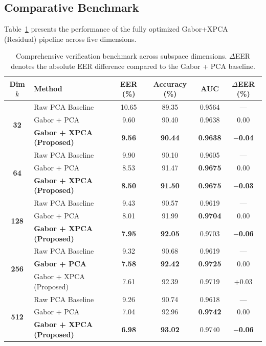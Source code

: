 \documentclass[conference]{IEEEtran}
\begin{document}
\subsection{Comparative Benchmark}
Table~\ref{tab:comprehensive_benchmark} presents the performance of the fully optimized Gabor+XPCA (Residual) pipeline across five dimensions.

\begin{table}[t]
\centering
\caption{Comprehensive verification benchmark across subspace dimensions. $\Delta$EER denotes the absolute EER difference compared to the Gabor + PCA baseline.}
\label{tab:comprehensive_benchmark}
\begin{tabular}{@{}clcccc@{}}
\toprule
\textbf{Dim $k$} & \textbf{Method} & \textbf{EER (\%)} & \textbf{Accuracy (\%)} & \textbf{AUC} & \textbf{$\Delta$EER (\%)} \\
\midrule
\multirow{3}{*}{\textbf{32}}
    & Raw PCA Baseline & 10.65 & 89.35 & 0.9564 & --- \\
    & Gabor + PCA & 9.60 & 90.40 & 0.9638 & 0.00 \\
    & \textbf{Gabor + XPCA (Proposed)} & \textbf{9.56} & \textbf{90.44} & \textbf{0.9638} & \textbf{$-$0.04} \\
\midrule
\multirow{3}{*}{\textbf{64}}
    & Raw PCA Baseline & 9.90 & 90.10 & 0.9605 & --- \\
    & Gabor + PCA & 8.53 & 91.47 & \textbf{0.9675} & 0.00 \\
    & \textbf{Gabor + XPCA (Proposed)} & \textbf{8.50} & \textbf{91.50} & \textbf{0.9675} & \textbf{$-$0.03} \\
\midrule
\multirow{3}{*}{\textbf{128}}
    & Raw PCA Baseline & 9.43 & 90.57 & 0.9619 & --- \\
    & Gabor + PCA & 8.01 & 91.99 & \textbf{0.9704} & 0.00 \\
    & \textbf{Gabor + XPCA (Proposed)} & \textbf{7.95} & \textbf{92.05} & 0.9703 & \textbf{$-$0.06} \\
\midrule
\multirow{3}{*}{\textbf{256}}
    & Raw PCA Baseline & 9.32 & 90.68 & 0.9619 & --- \\
    & \textbf{Gabor + PCA} & \textbf{7.58} & \textbf{92.42} & \textbf{0.9725} & 0.00 \\
    & Gabor + XPCA (Proposed) & 7.61 & 92.39 & 0.9719 & +0.03 \\
\midrule
\multirow{3}{*}{\textbf{512}}
    & Raw PCA Baseline & 9.26 & 90.74 & 0.9618 & --- \\
    & Gabor + PCA & 7.04 & 92.96 & \textbf{0.9742} & 0.00 \\
    & \textbf{Gabor + XPCA (Proposed)} & \textbf{6.98} & \textbf{93.02} & 0.9740 & \textbf{$-$0.06} \\
\bottomrule
\end{tabular}
\end{table}
\end{document}
